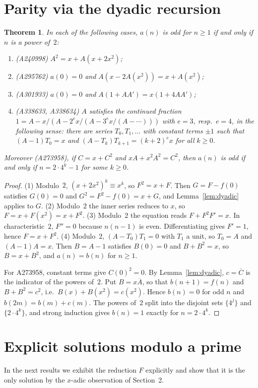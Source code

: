 \documentclass[11pt]{article}
\newtheorem{theorem}{Theorem}
\theoremstyle{remark}
\begin{document}
\section{Parity via the dyadic recursion}
\begin{theorem}\label{thm:parity}
In each of the following cases, $a(n)$ is odd for $n\ge1$ if and only if $n$
is a power of~$2$:
\begin{enumerate}
\item (A240998) $A^2=x+A(x+2x^2)$;
\item (A295762) $a(0)=0$ and $A(x-2A(x^2))=x+A(x^2)$;
\item (A301933) $a(0)=0$ and $A(1+AA')=x(1+4AA')$;
\item (A338633, A338634) $A$ satisfies the continued fraction
 $1=A-x/(A-2^ex/(A-3^ex/(A-\cdots)))$ with $e=3$, resp.\ $e=4$, in the
 following sense: there are series $T_0,T_1,\dots$ with constant terms
 $\pm1$ such that $(A-1)T_0=x$ and $(A-T_k)T_{k+1}=(k+2)^ex$ for all
 $k\ge0$.
\end{enumerate}
Moreover (A273958), if $C=x+C^2$ and $xA+x^2A^2=C^2$, then $a(n)$ is odd if
and only if $n=2\cdot4^k-1$ for some $k\ge0$.
\end{theorem}
\begin{proof}
(1) Modulo~$2$, $(x+2x^2)^k\equiv x^k$, so $F^2=x+F$. Then $G=F-f(0)$
satisfies $G(0)=0$ and $G^2=F^2-f(0)=x+G$, and Lemma~\ref{lem:dyadic}
applies to $G$.
(2) Modulo~$2$ the inner series reduces to $x$, so $F=x+F(x^2)=x+F^2$.
(3) Modulo~$2$ the equation reads $F+F^2F'=x$. In characteristic~$2$,
$F''=0$ because $n(n-1)$ is even. Differentiating gives $F'=1$, hence
$F=x+F^2$.
(4) Modulo~$2$, $(A-T_0)T_1=0$ with $T_1$ a unit, so $T_0=A$ and
$(A-1)A=x$. Then $B=A-1$ satisfies $B(0)=0$ and $B+B^2=x$, so $B=x+B^2$, and
$a(n)=b(n)$ for $n\ge1$.

For A273958, constant terms give $C(0)^2=0$. By Lemma~\ref{lem:dyadic},
$c=\overline C$ is the indicator of the powers of~$2$. Put $B=x\overline A$,
so that $b(n+1)=f(n)$ and $B+B^2=c^2$, i.e.\ $B(x)+B(x^2)=c(x^2)$. Hence
$b(n)=0$ for odd $n$ and $b(2m)=b(m)+c(m)$. The powers of~$2$ split into the
disjoint sets $\{4^j\}$ and $\{2\cdot4^k\}$, and strong induction gives
$b(n)=1$ exactly for $n=2\cdot4^k$.
\end{proof}

\section{Explicit solutions modulo a prime}\label{sec:explicit}
In the next results we exhibit the reduction $F$ explicitly and show that it
is the only solution by the $x$-adic observation of Section~2.
\end{document}
